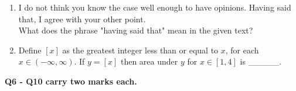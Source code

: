 \documentclass[12pt,onecolumn]{article}
\begin{document}
\begin{enumerate}
    \item I do not think you know the case well enough to have opinions. Having said that, I agree with your other point.\\
          What does the phrase "having said that" mean in the given text?
          \begin{enumerate}
          \end{enumerate}

    \item Define $[x]$ as the greatest integer less than or equal to $x$, for each $x \in (-\infty, \infty)$. If $y = [x]$ then area under $y$ for $x \in [1, 4]$ is \_\_\_\_\_.
          \begin{enumerate}
          \end{enumerate}
\end{enumerate}
\normalsize\textbf{Q6 - Q10 carry two marks each.}
\end{document}
